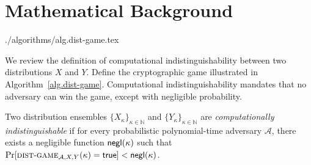 \section{Mathematical Background}\label{sec.background}

{./algorithms/alg.dist-game.tex}

We review the definition of computational indistinguishability between two
distributions $X$ and $Y$. Define the cryptographic game illustrated in
Algorithm~\ref{alg.dist-game}.
Computational indistinguishability mandates that no adversary can win the game,
except with negligible probability.

\begin{definition}
  Two distribution ensembles $\{X_\kappa\}_{\kappa\in\mathbb{N}}$ and $\{Y_\kappa\}_{\kappa\in\mathbb{N}}$ are
  \emph{computationally indistinguishable}
  if for every probabilistic polynomial-time adversary $\mathcal{A}$,
  there exists a negligible function $\textsf{negl}(\kappa)$ such that
  $\Pr[\textsc{dist}\-\text{-}\-\textsc{game}_{\mathcal{A},X,Y}(\kappa) = \mathsf{true}] < \textsf{negl}(\kappa)$.
\end{definition}
